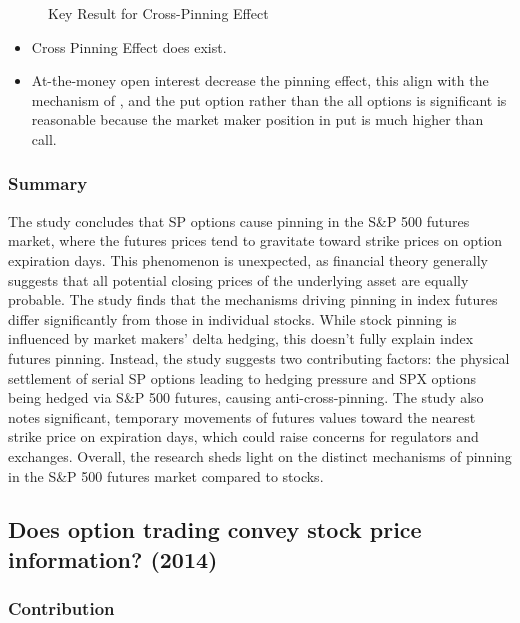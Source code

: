 \documentclass[10pt]{report}
\begin{document}
\begin{enumerate}
\begin{figure}[!h]
        \caption{Key Result for Cross-Pinning Effect}
        \label{p2}
    \end{figure}
    \begin{itemize}
    \item Cross Pinning Effect does exist.
    \item At-the-money open interest decrease the pinning effect, this align with the mechanism of \citet{Avellaneda2003AMM}, and the put option rather than the all options is significant is reasonable because the market maker position in put is much higher than call.
\end{itemize}
\end{enumerate}
\subsubsection{Summary}

The study concludes that SP options cause pinning in the S\&P 500 futures market, where the futures prices tend to gravitate toward strike prices on option expiration days. This phenomenon is unexpected, as financial theory generally suggests that all potential closing prices of the underlying asset are equally probable. The study finds that the mechanisms driving pinning in index futures differ significantly from those in individual stocks. While stock pinning is influenced by market makers' delta hedging, this doesn't fully explain index futures pinning. Instead, the study suggests two contributing factors: the physical settlement of serial SP options leading to hedging pressure and SPX options being hedged via S\&P 500 futures, causing anti-cross-pinning. The study also notes significant, temporary movements of futures values toward the nearest strike price on expiration days, which could raise concerns for regulators and exchanges. Overall, the research sheds light on the distinct mechanisms of pinning in the S\&P 500 futures market compared to stocks.



\clearpage
\subsection{Does option trading convey stock price information? (2014)}
\subsubsection{Contribution}
\end{document}

